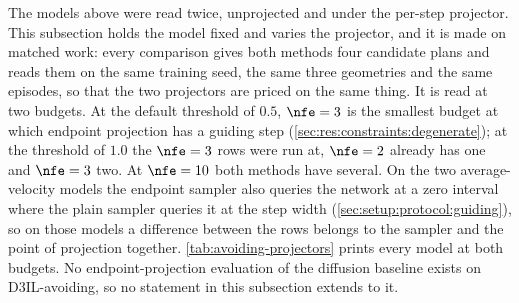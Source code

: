 The models above were read twice, unprojected and under the per-step projector. This subsection holds the
model fixed and varies the projector, and it is made on matched work: every comparison gives both methods
four candidate plans and reads them on the same training seed, the same three geometries and the same
episodes, so that the two projectors are priced on the same thing. It is read at two budgets. At the
default threshold of $0.5$, $\nfe=3$ is the smallest budget at which endpoint projection has a guiding step
(\autoref{sec:res:constraints:degenerate}); at the threshold of $1.0$ the $\nfe=3$ rows were run at, $\nfe=2$
already has one and $\nfe=3$ two. At $\nfe=10$ both methods have several. On the two average-velocity models the endpoint sampler also
queries the network at a zero interval where the plain sampler queries it at the step width
(\autoref{sec:setup:protocol:guiding}), so on those models a difference between the rows belongs to the
sampler and the point of projection together. \autoref{tab:avoiding-projectors} prints every model at both budgets.
No endpoint-projection evaluation of the diffusion baseline exists on D3IL-avoiding, so no
statement in this subsection extends to it.

